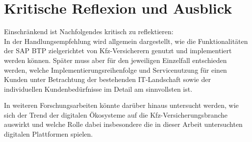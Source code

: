 \section{Kritische Reflexion und Ausblick}

Einschränkend ist Nachfolgendes kritisch zu reflektieren:\\
In der Handlungsempfehlung wird allgemein dargestellt, wie die Funktionalitäten der SAP BTP zielgerichtet von Kfz-Versicherern genutzt und implementiert werden können. Später muss aber für den jeweiligen Einzelfall entschieden werden, welche Implementierungsreihenfolge und Servicenutzung für einen Kunden unter Betrachtung der bestehenden IT-Landschaft sowie der individuellen Kundenbedürfnisse im Detail am sinnvollsten ist.

In weiteren Forschungsarbeiten könnte darüber hinaus untersucht werden, wie sich der Trend der digitalen Ökosysteme auf die Kfz-Versicherungsbranche auswirkt und welche Rolle dabei insbesondere die in dieser Arbeit untersuchten digitalen Plattformen spielen.








